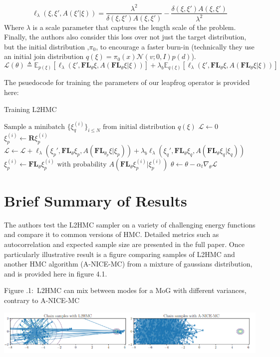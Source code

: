 \documentclass[twoside]{article}
\newcounter{lecnum}
\newcommand{\fig}[3]{
			\vspace{#2}
			\begin{center}
			Figure \thelecnum.#1:~#3
			\end{center}
	}
\begin{document}
\begin{equation*}
    \ell_{\lambda} (\xi, \xi', A(\xi'|\xi)) = \frac{\lambda^2}{\delta(\xi,\xi')A(\xi,\xi')} -\frac{\delta(\xi,\xi')A(\xi,\xi')}{\lambda^2}
\end{equation*}
Where $\lambda$ is a scale parameter that captures the length scale of the problem. Finally, the authors also consider this loss over not just the target distribution, but the initial distribution ,$\pi_0$, to encourage a faster burn-in (technically they use an initial join distribution $q(\xi) = \pi_0(x)\mathcal{N}(v;0,I)p(d)$).
\begin{equation*}
    \mathcal{L}(\theta) \triangleq \mathbb{E}_{p(\xi)}[\ell_{\lambda}(\xi', \textbf{FL}_\theta \xi, A(\textbf{FL}_\theta \xi | \xi))] + \lambda_b \mathbb{E}_{q(\xi)}[\ell_{\lambda}(\xi', \textbf{FL}_\theta \xi, A(\textbf{FL}_\theta \xi | \xi))]
\end{equation*}

The psuedocode for training the parameters of our leapfrog operator is provided here:

\begin{algorithm}[H]
\caption{Training L2HMC}
\label{L2HMCalgorithm}
\begin{algorithmic}[1]
    \State $\text{Sample a minibatch } \{ \xi_q^{(i)} \}_{i\leq N}  \text{ from initial distribution } q(\xi) $
    \State $\mathcal{L} \leftarrow 0$
        \State $\xi_p^{(i)} \leftarrow \textbf{R}\xi_p^{(i)}$
        \State $\mathcal{L} \leftarrow \mathcal{L} + \ell_{\lambda}(\xi_p', \textbf{FL}_\theta \xi_p, A(\textbf{FL}_\theta_p \xi | \xi_p)) + \lambda_b \ell_{\lambda}(\xi_q', \textbf{FL}_\theta \xi_q, A(\textbf{FL}_\theta \xi_q | \xi_q)) $
        \State $\xi_p^{(i)} \leftarrow \textbf{FL}_\theta \xi_p^{(i)} \text{ with probability } A(\textbf{FL}_\theta \xi_p^{(i)}|\xi_p^{(i)})$
    \EndFor
    \State $\theta \leftarrow \theta - \alpha_t \nabla_\theta \mathcal{L}$
\EndFor
\end{algorithmic}
\end{algorithm}


\section{Brief Summary of Results}
The authors test the L2HMC sampler on a variety of challenging energy functions and compare it to common versions of HMC. Detailed metrics such as autocorrelation and expected sample size are presented in the full paper. Once particularly illustrative result is a figure comparing samples of L2HMC and another HMC algorithm (A-NICE-MC) from a mixture of gaussians distribution, and is provided here in figure 4.1.


\fig{1}{0.2in}{L2HMC can mix between modes for a MoG with different variances, contrary to A-NICE-MC}
\includegraphics[width=\textwidth]{L2HMC-results.PNG}










\end{document}
